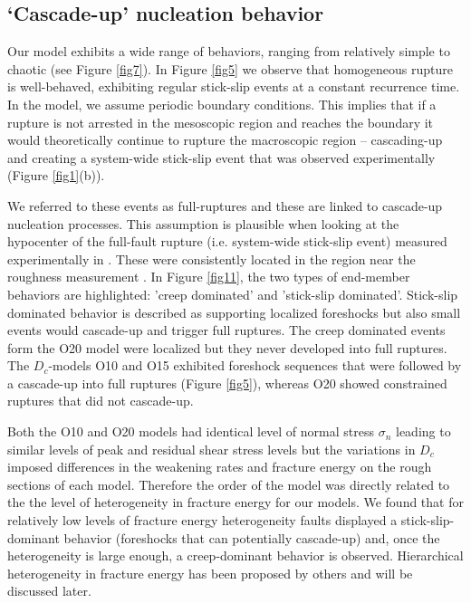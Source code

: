 \documentclass[preprint,1p, 10pt,authoryear]{elsarticle}
\begin{document}
\subsection{`Cascade-up' nucleation behavior}
\label{Cascade_UP}
Our model exhibits a wide range of behaviors, ranging from relatively simple to chaotic (see Figure \ref{fig7}). In Figure \ref{fig5} we observe that homogeneous rupture is well-behaved, exhibiting regular stick-slip events at a constant recurrence time.  In the model, we assume periodic boundary conditions. This implies that if a rupture is not arrested in the mesoscopic region and reaches the boundary it would theoretically continue to rupture the macroscopic region -- cascading-up and creating a system-wide stick-slip event that was observed experimentally (Figure \ref{fig1}(b)). 

We referred to these events as full-ruptures and these are linked to cascade-up nucleation processes. This assumption is plausible when looking at the hypocenter of the full-fault rupture (i.e. system-wide stick-slip event) measured experimentally in \citet{Selvadurai2015}. These were consistently located in the region near the roughness measurement \citep[magenta star in Fig. 7 and 8 in ][]{Selvadurai2015}. In Figure \ref{fig11}, the two types of end-member behaviors are highlighted: 'creep dominated' and 'stick-slip dominated'. Stick-slip dominated behavior is described as supporting localized foreshocks but also small events would cascade-up and trigger full ruptures. The creep dominated events form the O20 model were localized but they never developed into full ruptures. The $D_{c}$-models O10 and O15 exhibited foreshock sequences that were followed by a cascade-up into full ruptures (Figure \ref{fig5}), whereas O20 showed constrained ruptures that did not cascade-up. 

Both the O10 and O20 models had identical level of normal stress $\sigma_{n}$ leading to similar levels of peak and residual shear stress levels but the variations in $D_{c}$ imposed differences in the weakening rates and fracture energy on the rough sections of each model. Therefore the order of the model was directly related to the the level of heterogeneity in fracture energy for our models. We found that for relatively low levels of fracture energy heterogeneity faults displayed a stick-slip-dominant behavior (foreshocks that can potentially cascade-up) and, once the heterogeneity is large enough, a creep-dominant behavior is observed. Hierarchical heterogeneity in fracture energy has been proposed by others \citep{Ide2005, Aochi2014, Aochi2017} and will be discussed later.
\end{document}
